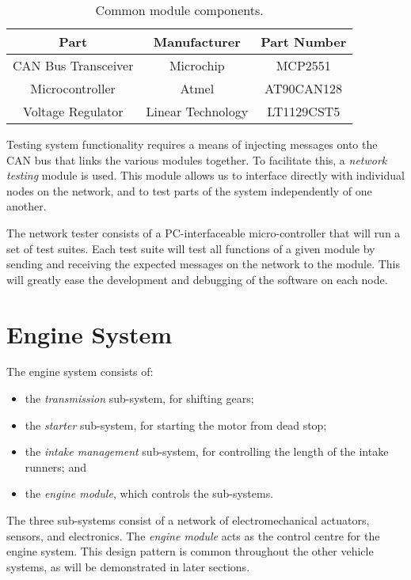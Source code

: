 \begin{table}[H]
	\caption{Common module components.}
	\label{table:common_module_components}
	\centering
	\begin{tabular}{|c|c|c|}
		\hline 
		Part & Manufacturer & Part Number\tabularnewline 
		\hline \hline
		CAN Bus Transceiver & Microchip & MCP2551\tabularnewline \hline
		Microcontroller & Atmel & AT90CAN128\tabularnewline \hline
		Voltage Regulator & Linear Technology & LT1129CST5\tabularnewline		
		\hline
	\end{tabular}
\end{table}

Testing system functionality requires a means of injecting messages onto the CAN bus that links the various modules together. To facilitate this, a \emph{network testing} module is used. This module allows us to interface directly with individual nodes on the network, and to test parts of the system independently of one another. 

The network tester consists of a PC-interfaceable micro-controller that will run a set of test suites. Each test suite will test all functions of a given module by sending and receiving the expected messages on the network to the module. This will greatly ease the development and debugging of the software on each node.

%
%

\section{Engine System}
\label{sec:engine_system}

The engine system consists of:

\begin{itemize}
\item the \emph{transmission} sub-system, for shifting gears;
\item the \emph{starter} sub-system, for starting the motor from dead stop; 
\item the \emph{intake management} sub-system, for controlling the length of the intake runners; and
\item the \emph{engine module}, which controls the sub-systems.
\end{itemize}

The three sub-systems consist of a network of electromechanical actuators, sensors, and electronics. The \emph{engine module} acts as the control centre for the engine system. This design pattern is common throughout the other vehicle systems, as will be demonstrated in later sections.

